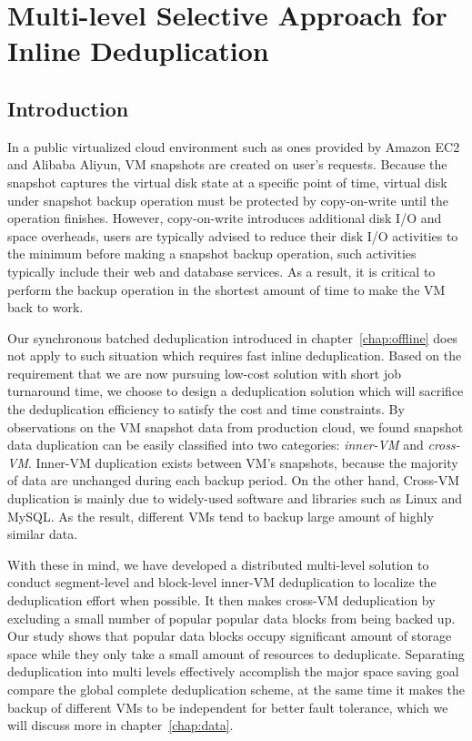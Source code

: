 \chapter{Multi-level Selective Approach for Inline Deduplication}
\label{chap:inline}

\section{Introduction}
\label{inline:intro}
In a public virtualized cloud environment such as ones provided by Amazon EC2\cite{AmazonEC2} and Alibaba Aliyun\cite{Aliyun},
VM snapshots are created on user's requests. Because the snapshot captures 
the virtual disk state at a specific point of time,
virtual disk under snapshot backup operation must be protected by copy-on-write until the 
operation finishes. However, copy-on-write introduces additional disk I/O and space overheads, 
users are typically advised to reduce their disk I/O activities to the minimum before making
a snapshot backup operation, such activities typically include their web and database services. 
As a result,
it is critical to perform the backup operation in the shortest amount of time 
to make the VM back to work.

Our synchronous batched deduplication introduced in chapter~\ref{chap:offline} does not apply 
to such situation which requires fast inline deduplication.
Based on the requirement that we are now pursuing low-cost solution with short job turnaround time,
we choose to design a deduplication solution which will sacrifice the deduplication efficiency to 
satisfy the cost and time constraints.
By observations on the VM snapshot data from production cloud, we found snapshot data duplication 
can be easily classified into two categories: \emph{inner-VM} and \emph{cross-VM}. Inner-VM duplication
exists between VM's snapshots, because the majority of data are unchanged during each backup period. 
On the other hand, Cross-VM duplication is mainly due to widely-used software and libraries such as Linux and MySQL.
As the result, different VMs tend to backup large amount of highly similar data.

With these in mind, we have developed a distributed multi-level solution to conduct 
segment-level  and block-level inner-VM  deduplication to localize the deduplication effort when possible.
It then makes cross-VM deduplication by excluding a small number of
popular popular data blocks from being backed up. Our study shows that popular data blocks
occupy significant amount of storage space while they only take
a small amount of resources to deduplicate.
Separating deduplication into multi levels effectively accomplish the major space saving goal
compare the global complete deduplication scheme, at the same time it makes
the backup of different VMs to be independent for better fault tolerance, 
which we will discuss more in chapter~\ref{chap:data}.

